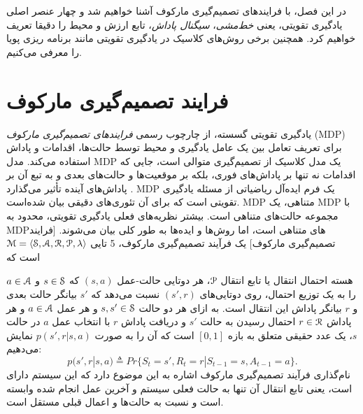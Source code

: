 
  در این فصل، با فرایندهای تصمیم‌گیری مارکوف آشنا خواهیم شد و چهار عنصر اصلی یادگیری تقویتی، یعنی \textit{خط‌مشی}، \textit{سیگنال پاداش}، تابع ارزش و محیط را دقیقا تعریف خواهیم کرد. همچنین برخی روش‌های کلاسیک در یادگیری تقویتی مانند برنامه ریزی پویا را معرفی می‌کنیم.



\section{فرایند تصمیم‌گیری مارکوف}

یادگیری تقویتی گسسته، از چارچوب رسمی \textit{فرایندهای تصمیم‌گیری مارکوف} (MDP)
 برای تعریف تعامل بین یک عامل یادگیری و محیط توسط حالت‌ها، اقدامات و پاداش استفاده می‌کند. مدل MDP یک مدل کلاسیک از تصمیم‌گیری متوالی است، جایی که اقدامات نه تنها بر پاداش‌های فوری، بلکه بر موقعیت‌ها و حالت‌های بعدی و به تبع آن بر پاداش‌های آینده تأثیر می‌گذارد
 \cite{suttonbook}.
MDP
 یک فرم ایده‌آل ریاضیاتی از مسئله یادگیری تقویتی است که برای آن تئوری‌های دقیقی بیان شده‌است.
MDP متناهی،
 یک MDP با مجموعه حالت‌های متناهی است. 
بیشتر نظریه‌های فعلی یادگیری تقویتی، محدود به MDPهای متناهی است، اما روش‌ها و ایده‌ها به طور کلی بیان می‌شوند.
[فرایند تصمیم‌گیری مارکوف] 
یک فرآیند تصمیم‌گیری مارکوف، 5 تایی 
$\EuScript{M} = \left< \EuScript{S},\EuScript{A},\EuScript{R},\EuScript{P}, \lambda \right>$
است که

هسته احتمال انتقال یا تابع انتقال $\EuScript{P}$، هر دوتایی حالت-عمل
$(s,a)$ که 
$s \in \EuScript{S}$
و
$a \in \EuScript{A}$
را به یک توزیع احتمال، روی دوتایی‌های 
$(s',r)$
نسبت می‌دهد که $s'$ بیانگر حالت بعدی و $r$ بیانگر پاداش این انتقال است. به ازای هر دو حالت 
$s,s' \in \EuScript{S}$
 و هر عمل 
 $a \in \EuScript{A}$
  و هر پاداش 
  $r \in \EuScript{R}$
  احتمال رسیدن به حالت $s'$ و دریافت پاداش $r$ با انتخاب عمل $a$ در حالت $s$، یک عدد حقیقی متعلق به  بازه $[0,1]$ است که آن را به صورت
$p(s',r|s,a)$
نمایش می‌دهیم:
$$p(s',r|s,a) \triangleq Pr\{S_t=s',R_t=r|S_{t-1}=s,A_{t-1}=a\}.$$ 
نام‌گذاری فرآیند تصمیم‌گیری مارکوف اشاره به این موضوع دارد که این سیستم‌ دارای   است، یعنی تابع انتقال آن تنها به حالت فعلی سیستم و آخرین عمل انجام شده وابسته است و نسبت به حالت‌ها و اعمال قبلی مستقل است.

